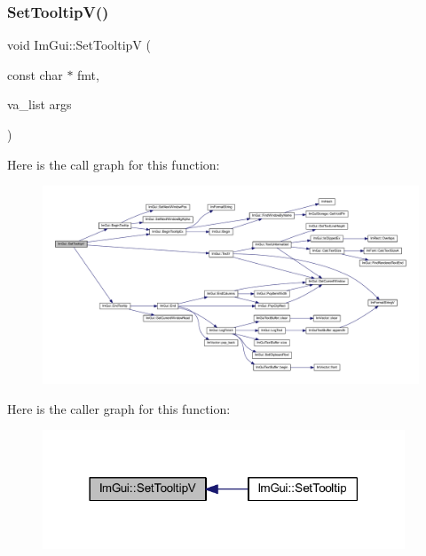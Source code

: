 \subsubsection{\texorpdfstring{Set\+Tooltip\+V()}{SetTooltipV()}}
{\footnotesize\ttfamily void Im\+Gui\+::\+Set\+TooltipV (\begin{DoxyParamCaption}\item[{const char $\ast$}]{fmt,  }\item[{va\+\_\+list}]{args }\end{DoxyParamCaption})}

Here is the call graph for this function\+:
\nopagebreak
\begin{figure}[H]
\begin{center}
\leavevmode
\includegraphics[width=350pt]{namespace_im_gui_a3826acf68fc4a12bb66401575f51d6a2_cgraph}
\end{center}
\end{figure}
Here is the caller graph for this function\+:
\nopagebreak
\begin{figure}[H]
\begin{center}
\leavevmode
\includegraphics[width=306pt]{namespace_im_gui_a3826acf68fc4a12bb66401575f51d6a2_icgraph}
\end{center}
\end{figure}
\mbox{\label{namespace_im_gui_ab5445711a74e0e1a58d1e464cdda252f}} 
